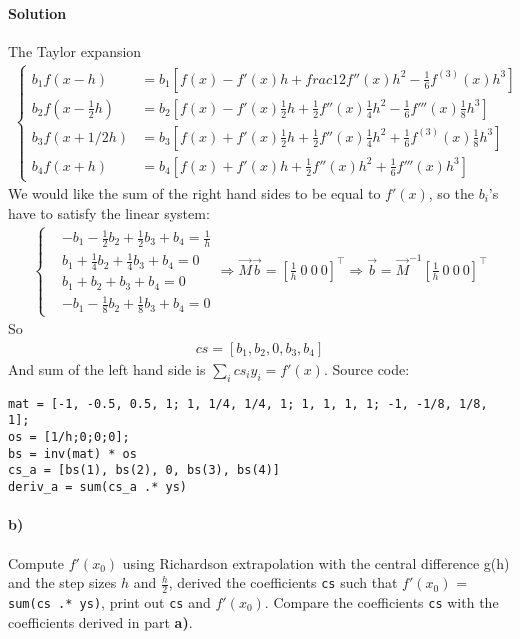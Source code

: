 \documentclass[12pt,a4paper,hidelinks,fleqn]{article}            %
\begin{document}
\paragraph{Solution}
The Taylor expansion
\begin{align*}
\begin{cases}
b_1 f(x - h) & = b_1 [f(x) - f'(x)h + frac12 f''(x)h^2 - \frac16 f^{(3)}(x)h^3] \\
b_2 f(x - \frac12 h) & = b_2 [f(x) - f'(x) \frac12 h + \frac12 f''(x) \frac14 h^2 - \frac16 f'''(x)\frac18 h^3] \\
b_3 f(x + 1/2 h) & = b_3 [f(x) + f'(x) \frac12 h + \frac12 f''(x) \frac14 h^2 + \frac16 f^{(3)}(x) \frac18 h^3] \\
b_4 f(x + h) & = b_4 [f(x) + f'(x)h + \frac12 f''(x)h^2 + \frac16 f'''(x)h^3]
\end{cases}
\end{align*}
We would like the sum of the right hand sides to be equal to $f'(x)$, 
so the $b_i$'s have to satisfy the linear system:
\begin{align*}
\begin{cases}
& -b_1 - \frac12 b_2   + \frac12 b_3 + b_4 = \frac1h \\
& b_1  + \frac14 b_2  + \frac14 b_3 + b_4 = 0   \\
& b_1  + b_2      + b_3     + b_4 = 0   \\
& -b_1 - \frac18 b_2  + \frac18 b_3 + b_4 = 0   
\end{cases} 
\Rightarrow  \vec{M} \vec{b} = \left[\frac1h\ 0\ 0\ 0 \right]^{\top}
\Rightarrow  \vec{b} = \vec{M}^{-1}\left[\frac1h\ 0\ 0\ 0 \right]^{\top}
\end{align*}
So 
\begin{align*}
cs = [b_1, b_2, 0, b_3, b_4]
\end{align*}
And sum of the left hand side is $\sum_i cs_i y_i = f'(x)$. Source code:
\begin{small}
\begin{verbatim}
mat = [-1, -0.5, 0.5, 1; 1, 1/4, 1/4, 1; 1, 1, 1, 1; -1, -1/8, 1/8, 1];
os = [1/h;0;0;0];
bs = inv(mat) * os
cs_a = [bs(1), bs(2), 0, bs(3), bs(4)]
deriv_a = sum(cs_a .* ys)
\end{verbatim}
\end{small}

\paragraph{b)} Compute $f'(x_0)$ using Richardson extrapolation with the central difference g(h) and the step sizes $h$ and $\displaystyle \frac{h}{2}$,
derived the coefficients \verb=cs= such that $f'(x_0)$ = \verb=sum(cs .* ys)=,
print out \verb=cs= and $f'(x_0)$. Compare the coefficients \verb=cs= with the coefficients derived in part \textbf{a)}.
\vspace{-6mm}
\end{document}
